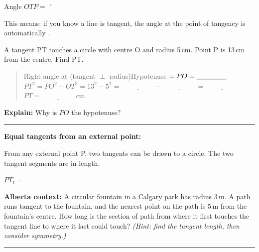 \documentclass[11pt, a4paper]{article}
\newcommand{\blank}[1]{\underline{\hspace{#1}}}
\newcommand{\dgr}{\ensuremath{^\circ}}
\newcommand{\answerline}{\par\vspace{0.45cm}\noindent\rule{\linewidth}{0.4pt}\par\vspace{0.1cm}}
\begin{document}
Angle $OTP = $ \blank{2cm}\dgr{}

This means: if you know a line is tangent, the angle at the point of tangency is automatically \blank{3.5cm}.

\begin{tcolorbox}[worked, title=Worked Example]
A tangent PT touches a circle with centre O and radius 5\,cm. Point P is 13\,cm from the centre. Find PT.

\begin{center}
\end{center}

\begin{quote}
Right angle at \blank{1.5cm} (tangent $\perp$ radius)\quad Hypotenuse $= PO = \blank{1.5cm}$\\[5pt]
$PT^2 = PO^2 - OT^2 = 13^2 - 5^2 = \blank{2cm} - \blank{2cm} = \blank{2cm}$\\[3pt]
$PT = \blank{2cm}$\,cm
\end{quote}
\textbf{Explain:} Why is $PO$ the hypotenuse?
\answerline
\end{tcolorbox}

\textbf{Equal tangents from an external point:}

From any external point P, two tangents can be drawn to a circle. The two tangent segments are \blank{4cm} in length.

$PT_1 = $ \blank{2cm}

\begin{tcolorbox}[connection]
\small\textbf{Alberta context:} A circular fountain in a Calgary park has radius 3\,m. A path runs tangent to the fountain, and the nearest point on the path is 5\,m from the fountain's centre. How long is the section of path from where it first touches the tangent line to where it last could touch? \textit{(Hint: find the tangent length, then consider symmetry.)}
\answerline
\end{tcolorbox}
\end{document}
